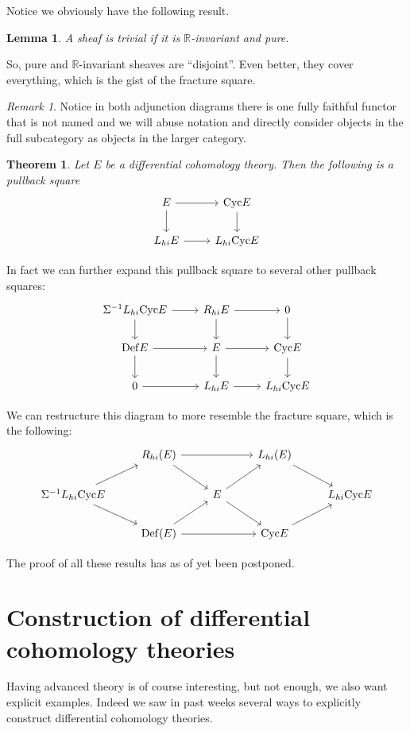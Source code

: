 \documentclass[10pt]{amsart}
\newcommand{\bR}{\mathbb{R}}
\newcommand{\Def}{\mathrm{Def}}
\newcommand{\Cyc}{\mathrm{Cyc}}
\newtheorem{theorem}[equation]{Theorem}
\newtheorem{lemma}[equation]{Lemma}
\theoremstyle{definition}
\theoremstyle{remark}
\newtheorem{remark}[equation]{Remark}
\numberwithin{equation}{section}
\begin{document}
Notice we obviously have the following result.

\begin{lemma}
  A sheaf is \emph{trivial} if it is $\mathbb{R}$-invariant and pure.
\end{lemma}

So, pure and $\bR$-invariant sheaves are ``disjoint''. Even better, they cover everything, which is the gist of the fracture square.

\begin{remark}
Notice in both adjunction diagrams there is one fully faithful functor that is not named and we will abuse notation and directly consider objects in the full subcategory as objects in the larger category.
\end{remark}
\begin{theorem}
 Let $E$ be a differential cohomology theory. Then the following is a pullback square
 \[
  \begin{tikzcd}
    E \arrow[r] \arrow[d] & \Cyc E \arrow[d] \\ 
    L_{hi}E \arrow[r] & L_{hi}\Cyc E
  \end{tikzcd}
 \]
\end{theorem}

In fact we can further expand this pullback square to several other pullback squares:
 \[
  \begin{tikzcd}
    \Sigma^{-1}L_{hi}\Cyc E \arrow[d] \arrow[r] & R_{hi}E \arrow[r] \arrow[d] & 0 \arrow[d] \\ 
    \Def E \arrow[r] \arrow[d] & E \arrow[r] \arrow[d] & \Cyc E \arrow[d] \\ 
    0 \arrow[r] & L_{hi}E \arrow[r] & L_{hi}\Cyc E
  \end{tikzcd}
 \]

We can restructure this diagram to more resemble the fracture square, which is the following:
\[
\begin{tikzcd}
 & R_{hi}(E) \arrow[dr] \arrow[rr] & & L_{hi}(E) \arrow[dr] & \\
 \Sigma^{-1}L_{hi}\Cyc E \arrow[ur] \arrow[dr ]& & E \arrow[ur] \arrow[dr] & & L_{hi}\Cyc E \\
  & \Def(E) \arrow[ur] \arrow[rr] & & \Cyc E \arrow[ur] & 
\end{tikzcd}
\]

 The proof of all these results has as of yet been postponed.


\section{Construction of differential cohomology theories}
Having advanced theory is of course interesting, but not enough, we also want explicit examples. Indeed we saw in past weeks several ways to explicitly construct differential cohomology theories.
\end{document}
